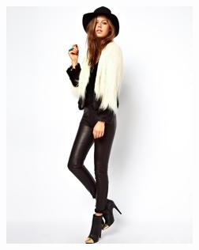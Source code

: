 \documentclass{article}
\begin{document}
\begin{figure}[ht]
\begin{minipage}[b]{0.2\linewidth}
    \end{minipage}
    \hfill
    \begin{minipage}[b]{0.2\linewidth}
        \centering
        \includegraphics[width=\linewidth]{imgs/00002.jpg}
    \end{minipage}
    \hfill
    \begin{minipage}[b]{0.2\linewidth}
        \centering

\end{minipage}
\end{figure}
\end{document}
